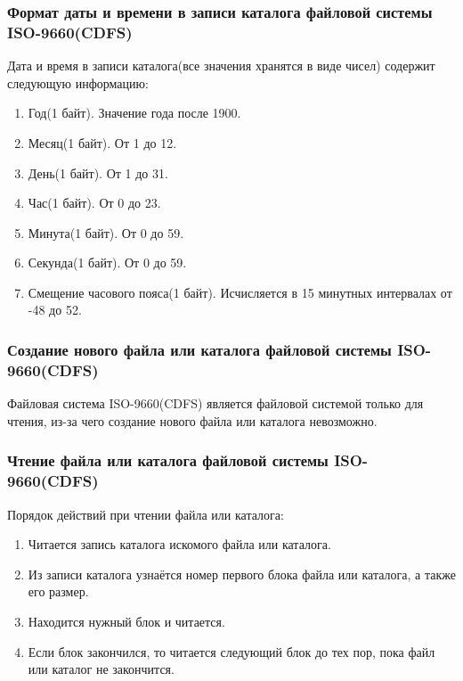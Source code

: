 \subsubsection{Формат даты и времени в записи каталога файловой системы ISO-9660(CDFS)}

Дата и время в записи каталога(все значения хранятся в виде чисел) содержит следующую информацию:

\begin{enumerate}
\item Год(1 байт). Значение года после 1900.
\item Месяц(1 байт). От 1 до 12.
\item День(1 байт). От 1 до 31.
\item Час(1 байт). От 0 до 23.
\item Минута(1 байт). От 0 до 59.
\item Секунда(1 байт). От 0 до 59.
\item Смещение часового пояса(1 байт). Исчисляется в 15 минутных интервалах от -48 до 52.
\end{enumerate}

\subsubsection{Создание нового файла или каталога файловой системы ISO-9660(CDFS)}

Файловая система ISO-9660(CDFS) является файловой системой только для чтения, из-за чего создание нового файла или каталога невозможно.

\subsubsection{Чтение файла или каталога файловой системы ISO-9660(CDFS)}

Порядок действий при чтении файла или каталога:

\begin{enumerate}
\item Читается запись каталога искомого файла или каталога.
\item Из записи каталога узнаётся номер первого блока файла или каталога, а также его размер.
\item Находится нужный блок и читается.
\item Если блок закончился, то читается следующий блок до тех пор, пока файл или каталог не закончится.
\end{enumerate}

